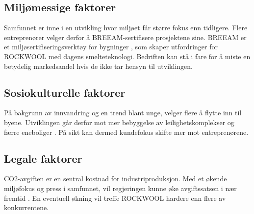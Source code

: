 \subsection{Miljømessige faktorer}
Samfunnet er inne i en utvikling hvor miljøet får større fokus enn tidligere. Flere entreprenører velger derfor å BREEAM-sertifisere prosjektene sine. BREEAM er et miljøsertifiseringsverktøy for bygninger \cite{BREEAM}, som skaper utfordringer for ROCKWOOL med dagens smelteteknologi. Bedriften kan stå i fare for å miste en betydelig markedsandel hvis de ikke tar hensyn til utviklingen.

\subsection{Sosiokulturelle faktorer} 
På bakgrunn av innvandring og en trend blant unge, velger flere å flytte inn til byene. Utviklingen går derfor mot mer bebyggelse av leilighetskomplekser og færre eneboliger \cite{Urbanisering}. På sikt kan dermed kundefokus skifte mer mot entreprenørene.

\subsection{Legale faktorer}
CO2-avgiften \cite{Finansdepartementet2018} er en sentral kostnad for industriproduksjon. Med et økende miljøfokus og press i samfunnet, vil regjeringen kunne øke avgiftssatsen i nær fremtid \cite{DagbladetCO2}. En eventuell økning vil treffe ROCKWOOL hardere enn flere av konkurrentene.





